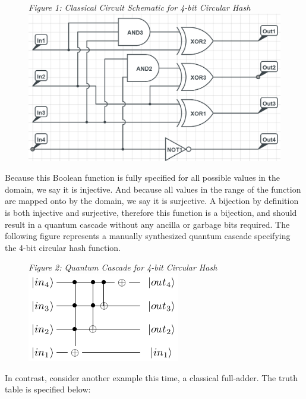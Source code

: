 \documentclass{IEEEtran}
\begin{document}
\begin{figure}[h!]
\begin{center}
\textit{\small{Figure 1: Classical Circuit Schematic for 4-bit Circular Hash}}
  \includegraphics[scale=0.4]{figures/4-bit_circular_hash_schematic.PNG}
\end{center}
\end{figure}

Because this Boolean function is fully specified for all possible values in the domain, we say it is injective. And because all values in the range of the function are mapped onto by the domain, we say it is surjective. A bijection by definition is both injective and surjective, therefore this function is a bijection, and should result in a quantum cascade without any ancilla or garbage bits required. The following figure represents a manually synthesized quantum cascade specifying the 4-bit circular hash function. 

\begin{figure}[h!]
\begin{center}
\textit{\small{Figure 2: Quantum Cascade for 4-bit Circular Hash}} 
  \includegraphics[scale=0.6]{figures/4-bit_circular_hash_qc.png}
\end{center}
\end{figure}

In contrast, consider another example this time, a classical full-adder. The truth table is specified below: 
\end{document}
